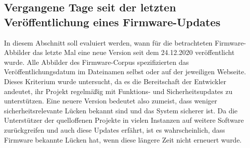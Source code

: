 \documentclass[a4paper]{book}
\begin{document}
\begin{large}
\subsection{Vergangene Tage seit der letzten Veröffentlichung eines Firmware-Updates}
\begin{onehalfspace}
In diesem Abschnitt soll evaluiert werden, wann für die betrachteten Firmware-Abbilder das letzte Mal eine neue Version seit dem 24.12.2020 veröffentlicht wurde. Alle Abbilder des Firmware-Corpus spezifizierten das Veröffentlichungsdatum im Dateinamen selbst oder auf der jeweiligen Webseite. Dieses Kriterium wurde untersucht, da es die Bereitschaft der Entwickler andeutet, ihr Projekt regelmäßig mit Funktions- und Sicherheitsupdates zu unterstützen. Eine neuere Version bedeutet also zumeist, dass weniger sicherheitsrelevante Lücken bekannt sind und das System sicherer ist. Da die Unterstützer der quelloffenen Projekte in vielen Instanzen auf weitere Software zurückgreifen und auch diese Updates erfährt, ist es wahrscheinlich, dass Firmware bekannte Lücken hat, wenn diese längere Zeit nicht erneuert wurde. \\ \indent

\end{onehalfspace}
\end{large}
\end{document}
